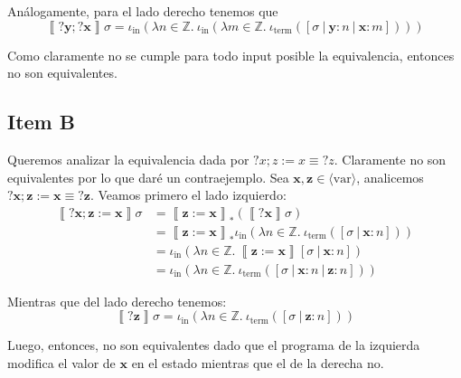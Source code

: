 \documentclass{article}
\newcommand{\aexp}[1]{\langle\text{#1}\rangle}
\newcommand{\var}{\aexp{var}}
\newcommand{\sem}[1]{\left\llbracket #1\right\rrbracket}
\newcommand{\Z}{\mathbb{Z}}
\newcommand{\x}{\textbf{x}}
\newcommand{\y}{\textbf{y}}
\newcommand{\z}{\textbf{z}}
\newcommand{\iterm}[1]{\iota_\text{term}\left(#1\right)}
\newcommand{\iin}[2]{\iota_\text{in}\left(\lambda #1 \in \Z .\ #2\right)}
\begin{document}
Análogamente, para el lado derecho tenemos que 
\begin{equation*}
  \sem{?\y; ?\x}\sigma = \iin{n}{\iin{m}{\iterm{[\sigma\ |\ \y : n\ |\ \x : m]}}}
\end{equation*}

Como claramente no se cumple para todo input posible la equivalencia, entonces no son equivalentes.

\subsection*{Item B}
Queremos analizar la equivalencia dada por $?x; z := x \equiv ?z$.
Claramente no son equivalentes por lo que daré un contraejemplo.
Sea $\x, \z \in \var$, analicemos $?\x; \z := \x \equiv ?\z$.
Veamos primero el lado izquierdo:
\begin{equation*}
  \begin{aligned}
    \sem{?\x; \z := \x}\sigma &= \sem{\z := \x}_* (\sem{?\x}\sigma) \\ 
                              &= \sem{\z := \x}_* \iin{n}{\iterm{[\sigma\ |\ \x : n]}} \\ 
                              &= \iin{n}{\sem{\z := \x}[\sigma\ |\ \x : n]} \\ 
                              &= \iin{n}{\iterm{[\sigma\ |\ \x : n\ |\ \z : n]}}
  \end{aligned}
\end{equation*}

Mientras que del lado derecho tenemos:
\begin{equation*}
  \sem{?\z}\sigma = \iin{n}{\iterm{[\sigma\ |\ \z : n]}}
\end{equation*}

Luego, entonces, no son equivalentes dado que el programa de la izquierda modifica el valor de $\x$ en el estado mientras que el de la derecha no.
\end{document}
